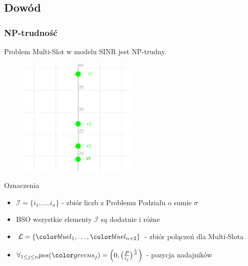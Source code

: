 \documentclass[polish, t,10pt]{beamer}
\begin{document}
\subsection{Dowód}
\begin{frame}
    \frametitle{NP-trudność}
    \begin{theorem}
        Problem Multi-Slot w modelu SINR jest NP-trudny.
    \end{theorem}
    \begin{figure}
        \includegraphics[width=0.5\textwidth]{pictures/np-placement1.png}
    \end{figure}
    \begin{block}{Oznaczenia}
        \begin{itemize}
            \item $\mathcal{I} = \{i_1, \ldots. i_n\}$ - zbiór liczb z Problemu Podziału o sumie $\sigma$
            \item BSO wszystkie elementy $\mathcal{I}$ są dodatnie i różne
            \item $\mathcal{L} = \{\lo, \ldots, \lnt\}$ - zbiór połączeń dla Multi-Slota
            \item $\forall_{1 \leq j \leq n} pos(\sj) = \Big(0, \big(\frac{P}{i_j}\big)^\frac{1}{\alpha}\Big)$ - pozycja nadajników
        \end{itemize}
    \end{block}
\end{frame}
\end{document}
